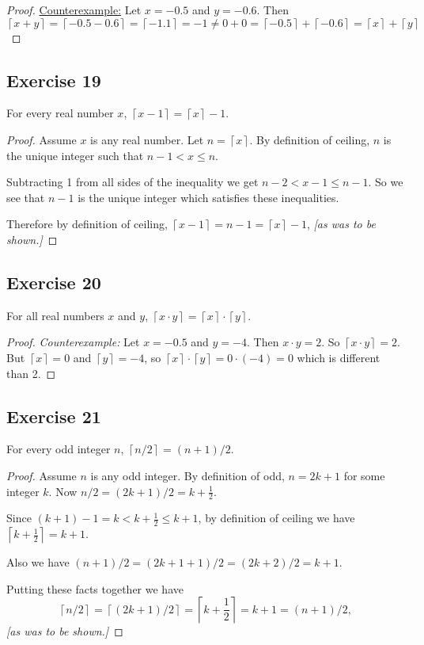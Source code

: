 \documentclass[14pt]{extarticle}
\newcommand{\ceil}[1]{{\left\lceil#1\right\rceil}}
\begin{document}
\begin{proof}
\underline{Counterexample:} Let $x = -0.5$ and $y = -0.6$. Then
\[
\ceil{x+y} = \ceil{-0.5-0.6} = \ceil{-1.1} = -1 \neq 0+0 = \ceil{-0.5} + \ceil{-0.6} = \ceil{x} + \ceil{y} 
\]
\end{proof}

\subsection{Exercise 19}
For every real number $x$, $\ceil{x - 1} = \ceil{x} - 1$.

\begin{proof}
Assume $x$ is any real number. Let $n = \ceil{x}$. By definition of ceiling, $n$ is the unique integer such that $n-1 < x \leq n$.

Subtracting 1 from all sides of the inequality we get $n-2 < x-1 \leq n-1$. So we see that $n-1$ is the unique integer which satisfies these inequalities.

Therefore by definition of ceiling, $\ceil{x-1} = n-1 = \ceil{x}-1$, {\it [as was to be shown.]}
\end{proof}

\subsection{Exercise 20}
For all real numbers $x$ and $y$, $\ceil{x \cdot y} = \ceil{x} \cdot \ceil{y}$.

\begin{proof}
{\it Counterexample:} Let $x = -0.5$ and $y = -4$. Then $x\cdot y = 2$. So $\ceil{x\cdot y} = 2$. But $\ceil{x} = 0$ and $\ceil{y} = -4$, so $\ceil{x} \cdot \ceil{y} = 0\cdot(-4) = 0$ which is different than 2.
\end{proof}

\subsection{Exercise 21}
For every odd integer $n$, $\ceil{n/2} = (n + 1) / 2$.

\begin{proof}
Assume $n$ is any odd integer. By definition of odd, $n = 2k+1$ for some integer $k$. Now $n/2 = (2k+1)/2 = k+\frac{1}{2}$.

Since $(k+1)-1 = k < k+\frac{1}{2} \leq k+1$, by definition of ceiling we have $\ceil{k+\frac{1}{2}} = k+1$.

Also we have $(n+1)/2 = (2k+1+1)/2 = (2k+2)/2 = k+1$.

Putting these facts together we have
\[
\ceil{n/2} = \ceil{(2k+1)/2} = \ceil{k+\frac{1}{2}} = k+1 = (n+1)/2,
\]
{\it[as was to be shown.]}
\end{proof}
\end{document}

